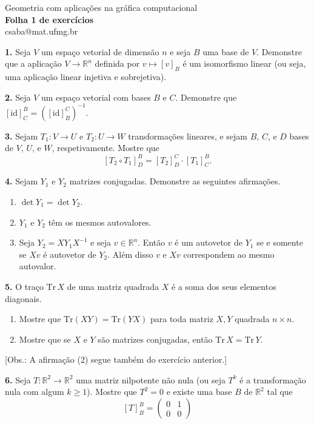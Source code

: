 \documentclass{amsart}
\newcommand{\R}{\mathbb R}
\begin{document}
\begin{center}
\large Geometria com aplicações na gráfica computacional\\
{\bf\large Folha 1 de exercícios}\\
csaba@mat.ufmg.br
\end{center}


\bigskip

{\bf 1.} 
Seja $V$ um espaço vetorial de dimensão $n$ e seja $B$ uma base de $V$.    
Demonstre que a aplicação $V\to \R^n$ definida por $v\mapsto [v]_B$ é um isomorfismo linear (ou seja, uma aplicação linear 
    injetiva e sobrejetiva).

\medskip

{\bf 2.} Seja $V$ um espaço vetorial com bases $B$ e $C$.
    Demonstre que $[\mbox{id}]_C^B=([\mbox{id}]_B^C)^{-1}$. 

    \medskip

{\bf 3.} Sejam $T_1:V\to U$ e $T_2:U\to W$ transformações lineares, e sejam $B$, $C$, e $D$ bases de 
$V$, $U$, e $W$, respetivamente. Mostre que 
\[
[T_2\circ T_1]^B_D=[T_2]^C_D\cdot [T_1]^B_C.
\]

\medskip


{\bf 4.} 
    Sejam $Y_1$ e $Y_2$ matrizes conjugadas. Demonstre as seguintes afirmações. 
    \begin{enumerate}
        \item $\det Y_1=\det Y_2$.
        \item $Y_1$ e $Y_2$ têm os mesmos autovalores.
        \item Seja $Y_2=XY_1X^{-1}$ e seja $v\in\R^n$. Então $v$ é um autovetor de $Y_1$ se e somente se 
        $Xv$ é autovetor de $Y_2$. Além disso $v$ e $Xv$ correspondem ao mesmo autovalor.
    \end{enumerate}

    \medskip

{\bf 5.} O traço $\mbox{Tr}\,X$ de uma matriz quadrada $X$ é a soma dos seus elementos diagonais. 
\begin{enumerate}
    \item Mostre que $\mbox{Tr}(XY)=\mbox{Tr}(YX)$ para toda matriz $X,Y$ quadrada $n\times n$.
    \item Mostre que se $X$ e $Y$ são matrizes conjugadas, então $\mbox{Tr}\,X=\mbox{Tr}\,Y$.
\end{enumerate}
[Obs.: A afirmação (2) segue também do exercício anterior.]

\medskip


{\bf 6.} Seja $T:\R^2\to \R^2$ uma matriz nilpotente não nula (ou seja $T^k$ é a transformação nula com algum $k\geq 1$).
Mostre que $T^2=0$ e existe uma base $B$ de $\R^2$ tal que 
\[
    [T]_B^B=\begin{pmatrix} 0 & 1 \\ 0 & 0 \end{pmatrix}
\]
\end{document}
